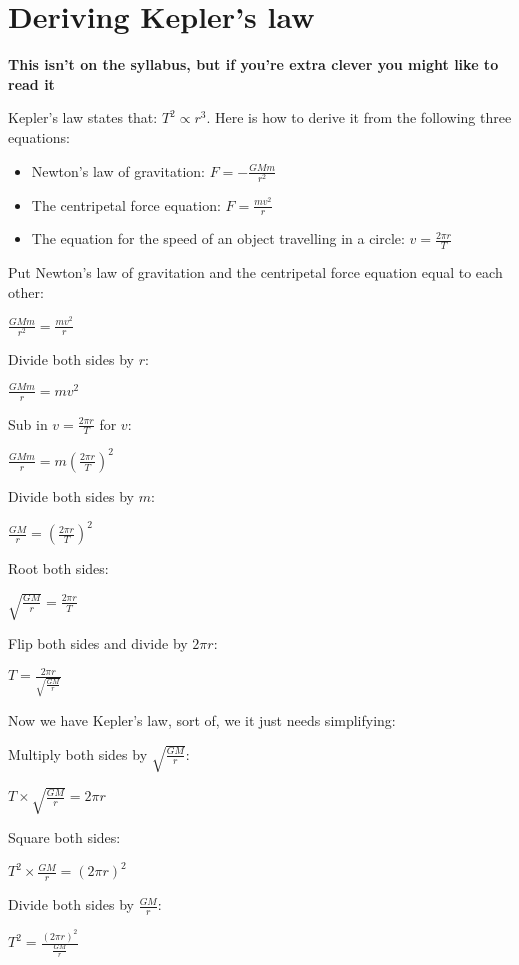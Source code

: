 \documentclass{article}
\begin{document}
\section*{Deriving Kepler's law}
\textbf{This isn't on the syllabus, but if you're extra clever you might like to read it}

Kepler's law states that: $T^2 \propto r^3$. Here is how to derive it from the following three equations:

\begin{itemize}

\item Newton's law of gravitation: $F = -\frac{GMm}{r^2}$

\item The centripetal force equation: $F = \frac{mv^2}{r}$

\item The equation for the speed of an object travelling in a circle: $v = \frac{2 \pi r}{T}$

\end{itemize}


Put Newton's law of gravitation and the centripetal force equation equal to each other:

$\frac{GMm}{r^2} = \frac{mv^2}{r}$

Divide both sides by $r$:

$\frac{GMm}{r} = mv^2$

Sub in $v = \frac{2 \pi r}{T}$ for $v$:

$\frac{GMm}{r} = m(\frac{2 \pi r}{T})^2$

Divide both sides by $m$:

$\frac{GM}{r} = (\frac{2 \pi r}{T})^2$

Root both sides:

$\sqrt{\frac{GM}{r}} = \frac{2 \pi r}{T}$

Flip both sides and divide by $2 \pi r$:

$T = \frac{2 \pi r}{\sqrt{\frac{GM}{r}}}$

Now we have Kepler's law, sort of, we it just needs simplifying:

Multiply both sides by $\sqrt{\frac{GM}{r}}$:

$T \times \sqrt{\frac{GM}{r}} = 2 \pi r$

Square both sides:

$T^2 \times \frac{GM}{r} = (2 \pi r)^2$

Divide both sides by $\frac{GM}{r}$:

$T^2 = \frac{(2 \pi r)^2}{\frac{GM}{r}}$
\end{document}
